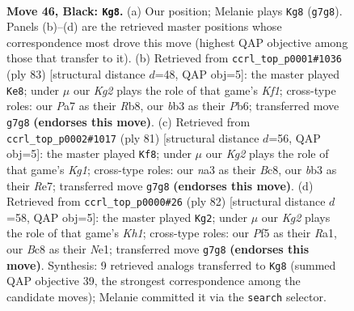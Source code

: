 \documentclass[11pt]{article}
\begin{document}
\clearpage

\begin{figure}[p]\centering
\begin{subfigure}{0.46\textwidth}\centering
\resizebox{\linewidth}{!}{%
\newchessgame
\chessboard[
  setfen={1rb5/p2p2k1/1pp5/5p1p/1PPPnP2/NB6/P6P/2R1K3 b - - 10 46},
  showmover=false,
  pgfstyle=straightmove, color=movearrow, markmove={g7-g8}
]}
\caption{}
\end{subfigure}\hfill
\begin{subfigure}{0.46\textwidth}\centering
\resizebox{\linewidth}{!}{%
\newchessgame
\chessboard[
  setfen={1r3k2/5p2/1p2p1p1/3nP1Pp/P3p3/1P6/3B1PP1/2R2K2 b - - 4 42},
  showmover=false,
  pgfstyle=straightmove, color=movearrow, markmove={f8-e8}
]}
\caption{}
\end{subfigure}
\\[4pt]
\begin{subfigure}{0.46\textwidth}\centering
\resizebox{\linewidth}{!}{%
\newchessgame
\chessboard[
  setfen={2b3k1/2p1r2p/1n1p4/1P1Pppp1/1P6/1B1P1P1P/4N1P1/4R1K1 b - - 0 41},
  showmover=false,
  pgfstyle=straightmove, color=movearrow, markmove={g8-f8}
]}
\caption{}
\end{subfigure}\hfill
\begin{subfigure}{0.46\textwidth}\centering
\resizebox{\linewidth}{!}{%
\newchessgame
\chessboard[
  setfen={2r2bk1/5p2/4pBpp/3pP3/1n1P1PP1/7P/8/R3N2K w - - 2 42},
  showmover=false,
  pgfstyle=straightmove, color=movearrow, markmove={h1-g2}
]}
\caption{}
\end{subfigure}
\caption{\textbf{Move 46, Black: \texttt{Kg8}.} (a) Our position; Melanie plays \texttt{Kg8} (\texttt{g7g8}). Panels (b)--(d) are the retrieved master positions whose correspondence most drove this move (highest QAP objective among those that transfer to it). (b) Retrieved from \texttt{ccrl\_top\_p0001\#1036} (ply 83) [structural distance $d$=48, QAP obj=5]: the master played \texttt{Ke8}; under $\mu$ our \emph{Kg2} plays the role of that game's \emph{Kf1}; cross-type roles: our \emph{P}a7 as their \emph{R}b8, our \emph{b}b3 as their \emph{P}b6; transferred move \texttt{g7g8} \textbf{(endorses this move)}. (c) Retrieved from \texttt{ccrl\_top\_p0002\#1017} (ply 81) [structural distance $d$=56, QAP obj=5]: the master played \texttt{Kf8}; under $\mu$ our \emph{Kg2} plays the role of that game's \emph{Kg1}; cross-type roles: our \emph{n}a3 as their \emph{B}c8, our \emph{b}b3 as their \emph{R}e7; transferred move \texttt{g7g8} \textbf{(endorses this move)}. (d) Retrieved from \texttt{ccrl\_top\_p0000\#26} (ply 82) [structural distance $d$=58, QAP obj=5]: the master played \texttt{Kg2}; under $\mu$ our \emph{Kg2} plays the role of that game's \emph{Kh1}; cross-type roles: our \emph{P}f5 as their \emph{R}a1, our \emph{B}c8 as their \emph{N}e1; transferred move \texttt{g7g8} \textbf{(endorses this move)}. Synthesis: 9 retrieved analogs transferred to \texttt{Kg8} (summed QAP objective 39, the strongest correspondence among the candidate moves); Melanie committed it via the \texttt{search} selector.}
\label{fig:thought-m91}
\end{figure}
\end{document}
